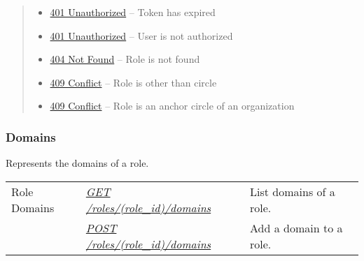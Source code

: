 \documentclass[letterpaper,10pt,english]{sphinxmanual}
\begin{document}
\begin{fulllineitems}
\begin{quote}
\begin{description}
\begin{itemize}
\item {} 
\href{http://www.w3.org/Protocols/rfc2616/rfc2616-sec10.html\#sec10.4.2}{401 Unauthorized} -- Token has expired

\item {} 
\href{http://www.w3.org/Protocols/rfc2616/rfc2616-sec10.html\#sec10.4.2}{401 Unauthorized} -- User is not authorized

\item {} 
\href{http://www.w3.org/Protocols/rfc2616/rfc2616-sec10.html\#sec10.4.5}{404 Not Found} -- Role is not found

\item {} 
\href{http://www.w3.org/Protocols/rfc2616/rfc2616-sec10.html\#sec10.4.10}{409 Conflict} -- Role is other than circle

\item {} 
\href{http://www.w3.org/Protocols/rfc2616/rfc2616-sec10.html\#sec10.4.10}{409 Conflict} -- Role is an anchor circle of an organization

\end{itemize}

\end{description}\end{quote}

\end{fulllineitems}



\subsubsection{Domains}
\label{\detokenize{resources/role:domains}}
Represents the domains of a role.

\noindent\begin{tabulary}{\linewidth}{|L|L|L|}
\hline
{}\relax &\relax &\relax \\
\hline
Role Domains
&
{\hyperref[\detokenize{resources/role:get--roles-(role_id)-domains}]{\emph{GET /roles/(role\_id)/domains}}}
&
List domains of a role.
\\
\hline&
{\hyperref[\detokenize{resources/role:post--roles-(role_id)-domains}]{\emph{POST /roles/(role\_id)/domains}}}
&
Add a domain to a role.
\\
\hline\end{tabulary}


\begin{DUlineblock}{0em}
\item[] 
\end{DUlineblock}
\end{document}
